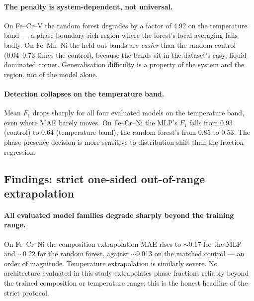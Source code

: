 \documentclass[preprint,12pt,authoryear]{elsarticle}
\begin{document}
\paragraph{The penalty is system-dependent, not universal.}
On Fe--Cr--V the random forest degrades by a factor of 4.92 on the temperature band
--- a phase-boundary-rich region where the forest's local averaging fails
badly. On Fe--Mn--Ni the held-out bands are \emph{easier} than the random
control (0.04--0.73 times the control), because the bands sit in the dataset's easy,
liquid-dominated corner. Generalisation difficulty is a property of the
system and the region, not of the model alone.

\paragraph{Detection collapses on the temperature band.}
Mean $F_1$ drops sharply for all four evaluated models on the temperature
band, even where
MAE barely moves. On Fe--Cr--Ni the MLP's $F_1$ falls from 0.93 (control) to
0.64 (temperature band); the random forest's from 0.85 to 0.53. The
phase-presence decision is more sensitive to distribution shift than the
fraction regression.

\subsection{Findings: strict one-sided out-of-range extrapolation}

\paragraph{All evaluated model families degrade sharply beyond the training
range.}
On Fe--Cr--Ni the composition-extrapolation MAE rises to $\sim$0.17 for the
MLP and $\sim$0.22 for the random forest, against $\sim$0.013 on the
matched control --- an order of magnitude. Temperature extrapolation is
similarly severe. No architecture evaluated in this study extrapolates phase
fractions reliably beyond the trained composition or temperature range;
this is the honest headline of the strict protocol.
\end{document}
